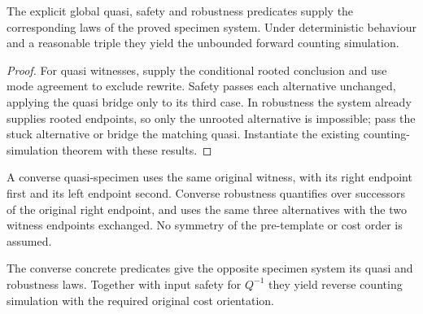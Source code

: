 

\begin{lemma}
The explicit global quasi, safety and robustness predicates supply the corresponding laws of the proved specimen system. Under deterministic behaviour and a reasonable triple they yield the unbounded forward counting simulation.
\end{lemma}

\begin{proof}
For quasi witnesses, supply the conditional rooted conclusion and use mode agreement to exclude rewrite. Safety passes each alternative unchanged, applying the quasi bridge only to its third case. In robustness the system already supplies rooted endpoints, so only the unrooted alternative is impossible; pass the stuck alternative or bridge the matching quasi. Instantiate the existing counting-simulation theorem with these results.
\end{proof}







\begin{definition}
A converse quasi-specimen uses the same original witness, with its right endpoint first and its left endpoint second. Converse robustness quantifies over successors of the original right endpoint, and uses the same three alternatives with the two witness endpoints exchanged. No symmetry of the pre-template or cost order is assumed.
\end{definition}




\begin{lemma}
The converse concrete predicates give the opposite specimen system its quasi and robustness laws. Together with input safety for $Q^{-1}$ they yield reverse counting simulation with the required original cost orientation.
\end{lemma}

